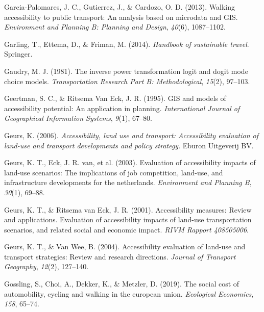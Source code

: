 \documentclass[
11pt, %
oneside, %
english, %
singlespacing, %
]{macthesis} %
\newlength{\cslhangindent}
\newenvironment{CSLReferences}[2] %
 {%
  \setlength{\parindent}{0pt}
  \ifodd #1 \everypar{\setlength{\hangindent}{\cslhangindent}}\ignorespaces\fi
  \ifnum #2 > 0
  \setlength{\parskip}{#2\baselineskip}
  \fi
 }%
 {}
\begin{document}
\begin{CSLReferences}{1}{0}
\leavevmode{}%
Garcia-Palomares, J. C., Gutierrez, J., \& Cardozo, O. D. (2013). Walking accessibility to public transport: An analysis based on microdata and GIS. \emph{Environment and Planning B: Planning and Design}, \emph{40}(6), 1087--1102.

\leavevmode{}%
Garling, T., Ettema, D., \& Friman, M. (2014). \emph{Handbook of sustainable travel}. Springer.

\leavevmode{}%
Gaudry, M. J. (1981). The inverse power transformation logit and dogit mode choice models. \emph{Transportation Research Part B: Methodological}, \emph{15}(2), 97--103.

\leavevmode{}%
Geertman, S. C., \& Ritsema Van Eck, J. R. (1995). GIS and models of accessibility potential: An application in planning. \emph{International Journal of Geographical Information Systems}, \emph{9}(1), 67--80.

\leavevmode{}%
Geurs, K. (2006). \emph{Accessibility, land use and transport: Accessibility evaluation of land-use and transport developments and policy strategy}. Eburon Uitgeverij BV.

\leavevmode{}%
Geurs, K. T., Eck, J. R. van, et al. (2003). Evaluation of accessibility impacts of land-use scenarios: The implications of job competition, land-use, and infrastructure developments for the netherlands. \emph{Environment and Planning B}, \emph{30}(1), 69--88.

\leavevmode{}%
Geurs, K. T., \& Ritsema van Eck, J. R. (2001). Accessibility measures: Review and applications. Evaluation of accessibility impacts of land-use transportation scenarios, and related social and economic impact. \emph{RIVM Rapport 408505006}.

\leavevmode{}%
Geurs, K. T., \& Van Wee, B. (2004). Accessibility evaluation of land-use and transport strategies: Review and research directions. \emph{Journal of Transport Geography}, \emph{12}(2), 127--140.

\leavevmode{}%
Gossling, S., Choi, A., Dekker, K., \& Metzler, D. (2019). The social cost of automobility, cycling and walking in the european union. \emph{Ecological Economics}, \emph{158}, 65--74.


\end{CSLReferences}
\end{document}
